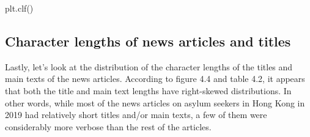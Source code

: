\documentclass[a4paper, oneside]{report}
\newenvironment{Shaded}{\begin{snugshade}}{\end{snugshade}}
\newcommand{\NormalTok}[1]{#1}
\renewenvironment{Shaded}
{
  \vspace{4pt}%
  \begin{snugshade}%
}{%
  \end{snugshade}%
  \vspace{4pt}%
}
\begin{document}
\begin{Shaded}
\begin{Highlighting}[]
\NormalTok{plt.clf()}
\end{Highlighting}
\end{Shaded}

\hypertarget{character-lengths-of-news-articles-and-titles}{%
\subsection{Character lengths of news articles and
titles}\label{character-lengths-of-news-articles-and-titles}}

Lastly, let's look at the distribution of the character lengths of the
titles and main texts of the news articles. According to figure 4.4 and
table 4.2, it appears that both the title and main text lengths have
right-skewed distributions. In other words, while most of the news
articles on asylum seekers in Hong Kong in 2019 had relatively short
titles and/or main texts, a few of them were considerably more verbose
than the rest of the articles.
\end{document}
